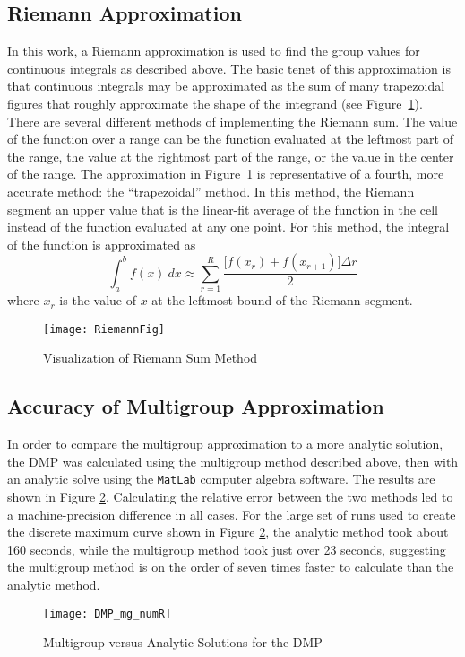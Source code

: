 \subsection{Riemann Approximation}
In this work, a Riemann approximation is used to find the group values for
continuous integrals as described above.  The basic tenet of this approximation
is that continuous integrals may be approximated as the sum of many trapezoidal
figures that roughly approximate the shape of the integrand (see Figure\
\ref{RiemannFig}).  There are several different methods of implementing the
Riemann sum.  The value of the function over a range can be the function
evaluated at the leftmost part of the range, the value at the rightmost part
of the range, or the value in the center of the range.  The approximation in
Figure\ \ref{RiemannFig} is representative of a fourth, more
accurate method: the ``trapezoidal'' method.  In this method, the Riemann
segment an upper value that is the linear-fit average of the function in the
cell instead of the function evaluated at any one point. For this method, the
integral of the function is approximated as
\[\int_a^b f(x)\ dx \approx \sum_{r=1}^R \frac{\big[f(x_r)+f(x_{r+1})\big]
  \Delta r}{2}\]
where $x_r$ is the value of $x$ at the leftmost bound of the Riemann segment.
\begin{figure}[htb]
\centering
\texttt{[image: RiemannFig]}
\caption{Visualization of Riemann Sum Method}
\label{RiemannFig}
\end{figure}

\newpage
\subsection{Accuracy of Multigroup Approximation}
In order to compare the multigroup approximation to a more analytic solution,
the DMP was calculated using the multigroup method described above, then with
an analytic solve using the \texttt{MatLab} computer algebra
software. The results are shown in Figure
\ref{mg_vs_anl}. Calculating the relative error between the two methods led to a
machine-precision difference in all cases.  For the large set of runs used to
create the discrete maximum curve shown in Figure \ref{mg_vs_anl}, the analytic
method took about 160 seconds, while the multigroup method took just over 23
seconds, suggesting the multigroup method is on the order of seven times faster
to calculate than the analytic method.
\begin{figure}[htb]
\centering
\texttt{[image: DMP\_mg\_numR]}
\caption{Multigroup versus Analytic Solutions for the DMP}
\label{mg_vs_anl}
\end{figure}
